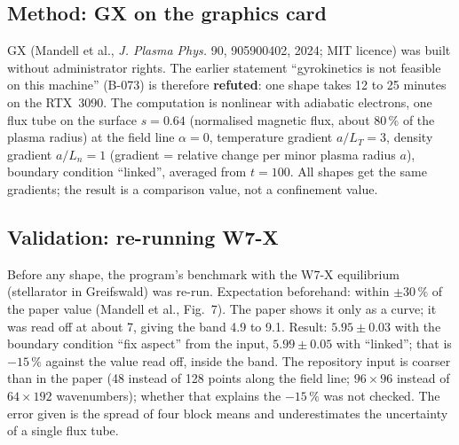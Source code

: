 \subsection{Method: GX on the graphics card}
GX (Mandell et al., \emph{J. Plasma Phys.} 90, 905900402, 2024; MIT licence) was built without administrator rights. The earlier statement ``gyrokinetics is not feasible on this machine'' (B-073) is therefore \textbf{refuted}:
one shape takes 12 to 25 minutes on the RTX~3090. The computation is nonlinear with adiabatic electrons, one flux tube on the surface $s=0.64$ (normalised magnetic flux, about 80\,\% of the plasma radius) at the field line $\alpha=0$,
temperature gradient $a/L_T=3$, density gradient $a/L_n=1$ (gradient = relative change per minor plasma radius $a$), boundary condition ``linked'', averaged from $t=100$.
All shapes get the same gradients; the result is a comparison value, not a confinement value.

\subsection{Validation: re-running W7-X}
Before any shape, the program's benchmark with the W7-X equilibrium (stellarator in Greifswald) was re-run. Expectation beforehand: within $\pm30\,\%$ of the paper value (Mandell et al., Fig.~7). The paper shows it only as a curve;
it was read off at about 7, giving the band 4.9 to 9.1. Result: $5.95\pm0.03$ with the boundary condition ``fix aspect'' from the input, $5.99\pm0.05$ with ``linked''; that is $-15\,\%$ against the value read off, inside the band.
The repository input is coarser than in the paper (48 instead of 128 points along the field line; $96\times96$ instead of $64\times192$ wavenumbers); whether that explains the $-15\,\%$ was not checked.
The error given is the spread of four block means and underestimates the uncertainty of a single flux tube.

